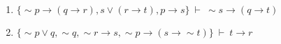 \documentclass[12pt, a4paper,final]{article}
\begin{document}
\begin{enumerate}
\begin{enumerate}
\item $\{ \sim p \rightarrow (q \rightarrow r), s \vee (r \rightarrow t), p \rightarrow s \} ~ \vdash ~ \sim s \rightarrow (q \rightarrow t)$

 

\item $\{ \sim p \vee q, \sim q, \sim r \rightarrow s, \sim p \rightarrow (s \rightarrow \sim t) \} ~ \vdash ~ t \rightarrow r$

 
 










\end{enumerate}
\end{enumerate}
\end{document}
